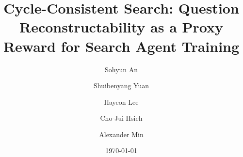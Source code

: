 \documentclass[]{fairmeta}
\title{Cycle-Consistent Search: Question Reconstructability as a Proxy Reward for Search Agent Training}
\author[1,2,*]{Sohyun An}
\author[1]{Shuibenyang Yuan}
\author[1]{Hayeon Lee}
\author[2,\dagger]{Cho-Jui Hsieh}
\author[1,\dagger]{Alexander Min}
\affiliation[1]{Meta Superintelligence Labs}
\affiliation[2]{UCLA}
\date{\today}
\begin{document}
\maketitle











\clearpage
\newpage
\beginappendix


\end{document}
